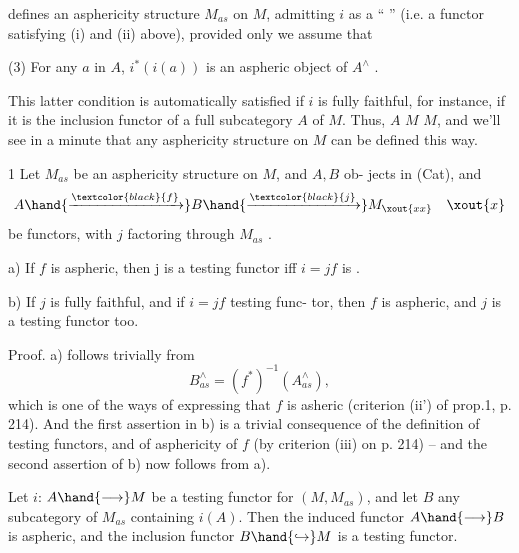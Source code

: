 
defines an asphericity structure  $M_{as}$ on $M$, admitting $i$ as a ``\hand{\uline{\textcolor{black}{testing}}}%
\hand{\uline{\textcolor{black}{functor}}}'' (i.e. a functor satisfying (i) and (ii) above), provided only
we assume that

(3) For any $a$ in $A$, $i^{*}(i(a))$ is an aspheric object of $A^{\wedge}$ .

This latter condition is automatically satisfied if $i$ is fully faithful,
for instance, if it is the inclusion functor of a full subcategory $A$
of $M$. Thus, \hand{\uline{\textcolor{black}{any small full subcategory}}} $A$ \hand{\uline{\textcolor{black}{of}}} $M$ \hand{\uline{\textcolor{black}{defines an asphericity}}}
\hand{\uline{\textcolor{black}{structure on}}} $M$, and we'll see in a minute that any asphericity structure
on $M$ can be defined this way.

\hand{\uline{\textcolor{black}{Proposition}}} 1 Let $M_{as}$ be an asphericity structure on $M$, and $A,B$ ob-%
jects in (Cat), and
\[ A \hand{\xrightarrow{\textcolor{black}{f}}} B \hand{\xrightarrow{\textcolor{black}{j}}} M_{\xout{xx}} \quad \xout{x} \]
be functors, with $j$ factoring through $M_{as}$ .

a) If $f$ is aspheric, then j is a testing functor iff $i=jf$ is .

b) If $j$ is fully faithful, and if  $i=jf$  testing func-%
tor, then $f$ is aspheric, and $j$ is a testing functor too.

Proof. a) follows trivially from
\[ B^{\wedge}_{as} = (f^{*})^{-1}(A^{\wedge}_{as}) , \]
which is one of the ways of expressing that $f$ is asheric\xout{\unsure{,}} (criterion
(ii') of prop.1, p. 214). And the first assertion in b) is a trivial
consequence of the definition of testing functors, and of asphericity
of $f$ (by criterion (iii) on p. 214) -- and the second assertion of b)
now follows from a).

\hand{\uline{\textcolor{black}{Corollary}}} Let $i$: $A\hand{\longrightarrow} M$ be a testing functor for $(M,M_{as})$, and let
$B$ any \hand{\uline{\textcolor{black}{small}}}  subcategory of $M_{as}$ containing $i(A)$. Then the induced functor
$A\hand{\longrightarrow} B$ is aspheric, and the inclusion functor $B\hand{\hookrightarrow} M$ is a testing functor.

